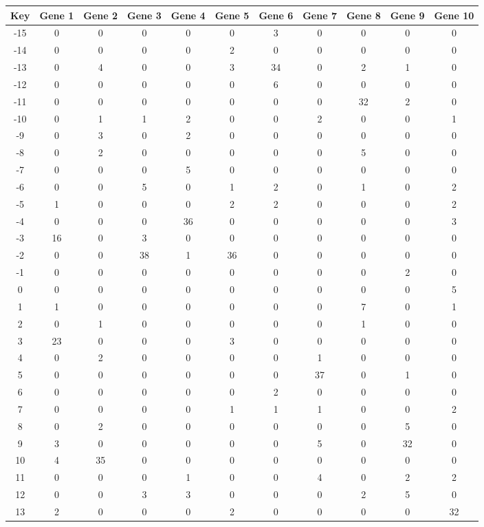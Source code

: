 \begin{tabular}{|c|c|c|c|c|c|c|c|c|c|c|}
\hline
Key & Gene 1 & Gene 2 & Gene 3 & Gene 4 & Gene 5 & Gene 6 & Gene 7 & Gene 8 & Gene 9 & Gene 10 \\
\hline
-15 & 0 & 0 & 0 & 0 & 0 & 3 & 0 & 0 & 0 & 0 \\
-14 & 0 & 0 & 0 & 0 & 2 & 0 & 0 & 0 & 0 & 0 \\
-13 & 0 & 4 & 0 & 0 & 3 & 34 & 0 & 2 & 1 & 0 \\
-12 & 0 & 0 & 0 & 0 & 0 & 6 & 0 & 0 & 0 & 0 \\
-11 & 0 & 0 & 0 & 0 & 0 & 0 & 0 & 32 & 2 & 0 \\
-10 & 0 & 1 & 1 & 2 & 0 & 0 & 2 & 0 & 0 & 1 \\
-9 & 0 & 3 & 0 & 2 & 0 & 0 & 0 & 0 & 0 & 0 \\
-8 & 0 & 2 & 0 & 0 & 0 & 0 & 0 & 5 & 0 & 0 \\
-7 & 0 & 0 & 0 & 5 & 0 & 0 & 0 & 0 & 0 & 0 \\
-6 & 0 & 0 & 5 & 0 & 1 & 2 & 0 & 1 & 0 & 2 \\
-5 & 1 & 0 & 0 & 0 & 2 & 2 & 0 & 0 & 0 & 2 \\
-4 & 0 & 0 & 0 & 36 & 0 & 0 & 0 & 0 & 0 & 3 \\
-3 & 16 & 0 & 3 & 0 & 0 & 0 & 0 & 0 & 0 & 0 \\
-2 & 0 & 0 & 38 & 1 & 36 & 0 & 0 & 0 & 0 & 0 \\
-1 & 0 & 0 & 0 & 0 & 0 & 0 & 0 & 0 & 2 & 0 \\
0 & 0 & 0 & 0 & 0 & 0 & 0 & 0 & 0 & 0 & 5 \\
1 & 1 & 0 & 0 & 0 & 0 & 0 & 0 & 7 & 0 & 1 \\
2 & 0 & 1 & 0 & 0 & 0 & 0 & 0 & 1 & 0 & 0 \\
3 & 23 & 0 & 0 & 0 & 3 & 0 & 0 & 0 & 0 & 0 \\
4 & 0 & 2 & 0 & 0 & 0 & 0 & 1 & 0 & 0 & 0 \\
5 & 0 & 0 & 0 & 0 & 0 & 0 & 37 & 0 & 1 & 0 \\
6 & 0 & 0 & 0 & 0 & 0 & 2 & 0 & 0 & 0 & 0 \\
7 & 0 & 0 & 0 & 0 & 1 & 1 & 1 & 0 & 0 & 2 \\
8 & 0 & 2 & 0 & 0 & 0 & 0 & 0 & 0 & 5 & 0 \\
9 & 3 & 0 & 0 & 0 & 0 & 0 & 5 & 0 & 32 & 0 \\
10 & 4 & 35 & 0 & 0 & 0 & 0 & 0 & 0 & 0 & 0 \\
11 & 0 & 0 & 0 & 1 & 0 & 0 & 4 & 0 & 2 & 2 \\
12 & 0 & 0 & 3 & 3 & 0 & 0 & 0 & 2 & 5 & 0 \\
13 & 2 & 0 & 0 & 0 & 2 & 0 & 0 & 0 & 0 & 32 \\
\hline
\end{tabular}